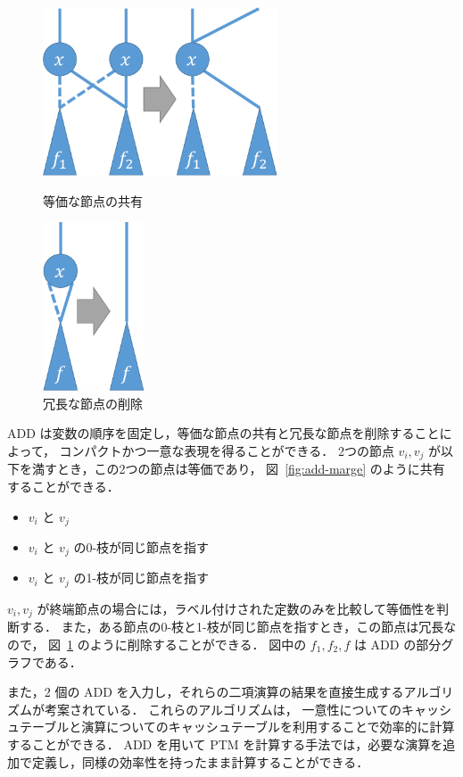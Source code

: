 \begin{figure}[tb]
  \begin{minipage}{0.5\hsize}
    \centering
    \includegraphics[height=50mm]{img/add-share-rule.pdf}
    \caption{等価な節点の共有}
    \label{fig:add-marge}
  \end{minipage}
  \begin{minipage}{0.5\hsize}
    \centering
    \includegraphics[height=50mm]{img/add-needlessly-rule.pdf}
    \caption{冗長な節点の削除}
    \label{fig:add-remove}
  \end{minipage}
\end{figure}
ADD は変数の順序を固定し，等価な節点の共有と冗長な節点を削除することによって，
コンパクトかつ一意な表現を得ることができる．
2つの節点 $v_i, v_j$ が以下を満すとき，この2つの節点は等価であり，
図~\ref{fig:add-marge} のように共有することができる．
\begin{itemize}
  \item $v_i$ と $v_j$ 
  \item $v_i$ と $v_j$ の0-枝が同じ節点を指す
  \item $v_i$ と $v_j$ の1-枝が同じ節点を指す
\end{itemize}
$v_i, v_j$ が終端節点の場合には，ラベル付けされた定数のみを比較して等価性を判断する．
また，ある節点の0-枝と1-枝が同じ節点を指すとき，この節点は冗長なので，
図~\ref{fig:add-remove} のように削除することができる．
図中の $f_1, f_2, f$ は ADD の部分グラフである．

また，2 個の ADD を入力し，それらの二項演算の結果を直接生成するアルゴリズムが考案されている．
これらのアルゴリズムは，
一意性についてのキャッシュテーブルと演算についてのキャッシュテーブルを利用することで効率的に計算することができる．
ADD を用いて PTM を計算する手法では，必要な演算を追加で定義し，同様の効率性を持ったまま計算することができる．


